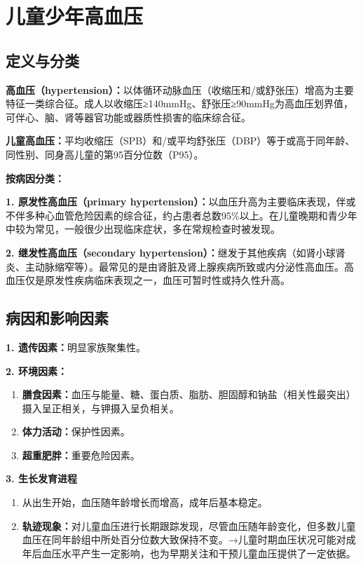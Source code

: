 \section{儿童少年高血压}

\subsection{定义与分类}

\begin{defbox}
\textbf{高血压（hypertension）：}以体循环动脉血压（收缩压和/或舒张压）增高为主要特征一类综合征。成人以收缩压≥140mmHg、舒张压≥90mmHg为高血压划界值，可伴心、脑、肾等器官功能或器质性损害的临床综合征。

\textbf{儿童高血压：}平均收缩压（SPB）和/或平均舒张压（DBP）等于或高于同年龄、同性别、同身高儿童的第95百分位数（P95）。
\end{defbox}

\begin{keybox}
\textbf{按病因分类：}

\textbf{1. 原发性高血压（primary hypertension）：}以血压升高为主要临床表现，伴或不伴多种心血管危险因素的综合征，约占患者总数95\%以上。在儿童晚期和青少年中较为常见，一般很少出现临床症状，多在常规检查时被发现。

\textbf{2. 继发性高血压（secondary hypertension）：}继发于其他疾病（如肾小球肾炎、主动脉缩窄等）。最常见的是由肾脏及肾上腺疾病所致或内分泌性高血压。高血压仅是原发性疾病临床表现之一，血压可暂时性或持久性升高。
\end{keybox}

\subsection{病因和影响因素}

\begin{keybox}
\textbf{1. 遗传因素：}明显家族聚集性。

\textbf{2. 环境因素：}
\begin{enumerate}[leftmargin=*]
    \item \textbf{膳食因素：}血压与能量、糖、蛋白质、脂肪、胆固醇和钠盐（相关性最突出）摄入呈正相关，与钾摄入呈负相关。
    \item \textbf{体力活动：}保护性因素。
    \item \textbf{超重肥胖：}重要危险因素。
\end{enumerate}

\textbf{3. 生长发育进程}
\begin{enumerate}[leftmargin=*]
    \item 从出生开始，血压随年龄增长而增高，成年后基本稳定。
    \item \textbf{轨迹现象：}对儿童血压进行长期跟踪发现，尽管血压随年龄变化，但多数儿童血压在同年龄组中所处百分位数大致保持不变。→儿童时期血压状况可能对成年后血压水平产生一定影响，也为早期关注和干预儿童血压提供了一定依据。
\end{enumerate}
\end{keybox}

